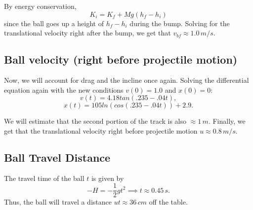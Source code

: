 \documentclass[12pt]{article} %
\begin{document}
By energy conservation,
$$K_i = K_f + Mg(h_f - h_i)$$
since the ball goes up a height of $h_f - h_i$ during the bump.
Solving for the translational velocity right after the bump, we get that $v_{bf} \approx 1.0\,m/s$.

\subsection{Ball velocity (right before projectile motion)}

Now, we will account for drag and the incline once again.
Solving the differential equation again with the new conditions $v(0) = 1.0$ and $x(0) = 0$: $$v(t) = 4.18tan(.235 - .04t),$$ $$x(t) = 105ln(cos(.235 - .04t)) + 2.9.$$

We will estimate that the second portion of the track is also $\approx 1\, m$. Finally, we get that the translational velocity right before projectile motion $u \approx 0.8\, m/s$.

\subsection{Ball Travel Distance}

The travel time of the ball $t$ is given by
$$-H = -\frac{1}{2}gt^2 \implies t \approx 0.45\,s.$$
Thus, the ball will travel a distance $ut \approx 36\,cm$ off the table.
\end{document}
